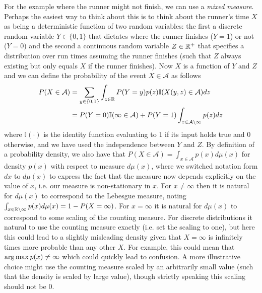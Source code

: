 For the example where the runner might not finish, we can
use a \emph{mixed measure}.  Perhaps the easiest way to think about this is to think about
the runner's time $X$ as being a deterministic function of two random variables: the first
a discrete random variable $Y\in\{0,1\}$ that dictates where the runner finishes ($Y=1$) or not ($Y=0$) and the second 
a continuous random variable $Z\in\mathbb{R}^+$ that specifies a distribution over run times assuming the
runner finishes (such that $Z$ always existing but only equals $X$ if the runner finishes).  
Now $X$ is a function of $Y$ and $Z$ and we can define the probability of the event
$X\in \mathcal{A}$ as follows
\begin{align*}
P(X \in \mathcal{A}) &= \sum_{y \in \{0,1\}} \int_{z\in \mathbb{R}} P(Y=y) p(z) \mathbb{I}(X(y,z) \in \mathcal{A}) dz \\
&= P(Y=0) \mathbb{I}(\infty\in \mathcal{A})  + P(Y=1) \int_{z\in \mathcal{A}\backslash\infty} p(z) dz
\end{align*}
where $\mathbb{I}(\cdot)$ is the identity function evaluating to $1$ if its
input holds true and $0$ otherwise, and we have used the independence between 
$Y$ and $Z$.  By definition of a probability density, we also
have that $P(X \in \mathcal{A}) = \int_{x\in\mathcal{A}} p(x) d\mu(x)$ for density $p(x)$
with respect to measure $d\mu(x)$, where we switched notation form $dx$ to $d\mu(x)$ to express
the fact that the measure now depends explicitly on the value of $x$, i.e. our measure
is non-stationary in $x$.  For $x\neq\infty$ then it is natural for $d\mu(x)$ to correspond to the
Lebesgue measure, noting $\int_{x\in \mathbb{R}\backslash\infty} p(x) d\mu(x) = 1-P(X=\infty)$.
For $x=\infty$ it is natural for $d\mu(x)$ to correspond to some scaling of the counting
measure.  For discrete distributions it natural to use the counting measure exactly (i.e. set the
scaling to one), but here this could lead to a slightly misleading density given that $X=\infty$
is infinitely times more probable than any other $X$.  For example, this could mean that
$\operatorname*{arg\,max} p(x) \neq \infty$ which could quickly lead to confusion.  A more illustrative
choice might use the counting measure scaled by an arbitrarily small value (such that
the density is scaled by large value), though strictly speaking this scaling should not be $0$.

